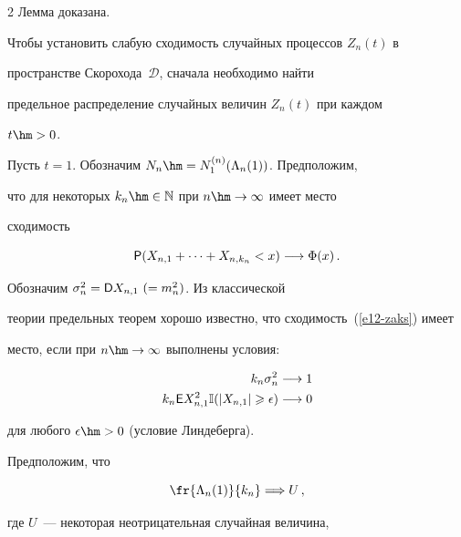 \begin{multicols}{2}
Лемма доказана.



\smallskip



Чтобы установить слабую сходимость случайных процессов $Z_n(t)$ в

пространстве Скорохода~$\mathcal{D}$, сначала необходимо найти

предельное распределение случайных величин $Z_n(t)$ при каждом

$t\hm>0$.



Пусть $t=1$. Обозначим $N_n\hm=N^{(n)}_{1}(\Lambda_n(1))$. Предположим,

что для некоторых $k_n\hm\in\mathbb{N}$ при $n\hm\to\infty$ имеет место

сходимость

\begin{equation}

{\sf P}(X_{n,1}+\cdots +X_{n,k_n}<x)\longrightarrow \Phi(x)\,.\label{e12-zaks}

\end{equation}

Обозначим $\sigma_n^2={\sf D}X_{n,1}\ (=m_n^2)$. Из классической

теории предельных теорем хорошо известно, что сходимость~(\ref{e12-zaks}) имеет

место, если при $n\hm\to\infty$ выполнены условия:

\begin{align}

k_n\sigma_n^2&\longrightarrow 1

\label{e13-zaks}

\\

k_n{\sf E}X_{n,1}^2 \mathbb{I}(|X_{n,1}|\geqslant\epsilon)&\longrightarrow 0

\label{e14-zaks}

\end{align}

для любого $\epsilon\hm>0$ (условие Линдеберга).



Предположим, что

\begin{equation}

\fr{\Lambda_n(1)}{k_n}\Longrightarrow U\,,\label{e15-zaks}

\end{equation}

где $U$~--- некоторая неотрицательная случайная величи\-на,


\end{multicols}
